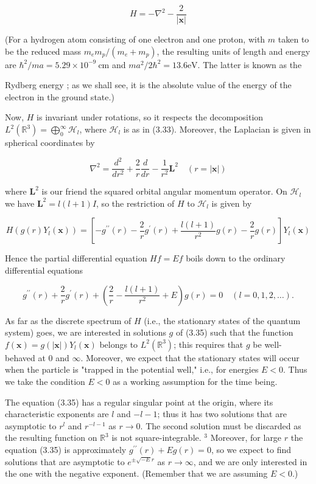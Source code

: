 \documentclass[10pt, letterpaper]{article}
\begin{document}
$$
H=-\nabla^{2}-\frac{2}{|\mathbf{x}|}
$$

(For a hydrogen atom consisting of one electron and one proton, with $m$ taken to be the reduced mass $m_{e} m_{p} /\left(m_{e}+m_{p}\right)$, the resulting units of length and energy are $\hbar^{2} / m a=5.29 \times 10^{-9} \mathrm{~cm}$ and $m a^{2} / 2 \hbar^{2}=13.6 \mathrm{eV}$. The latter is known as the

Rydberg energy ; as we shall see, it is the absolute value of the energy of the electron in the ground state.)

Now, $H$ is invariant under rotations, so it respects the decomposition $L^{2}\left(\mathbb{R}^{3}\right)= \bigoplus_{0}^{\infty} \mathcal{H}_{l}$, where $\mathcal{H}_{l}$ is as in (3.33). Moreover, the Laplacian is given in spherical coordinates by

$$
\nabla^{2}=\frac{d^{2}}{d r^{2}}+\frac{2}{r} \frac{d}{d r}-\frac{1}{r^{2}} \mathbf{L}^{2} \quad(r=|\mathbf{x}|)
$$

where $\mathbf{L}^{2}$ is our friend the squared orbital angular momentum operator. On $\mathscr{H}_{l}$ we have $\mathbf{L}^{2}=l(l+1) I$, so the restriction of $H$ to $\mathcal{H}_{l}$ is given by

$$
H\left(g(r) Y_{l}(\mathbf{x})\right)=\left[-g^{\prime \prime}(r)-\frac{2}{r} g^{\prime}(r)+\frac{l(l+1)}{r^{2}} g(r)-\frac{2}{r} g(r)\right] Y_{l}(\mathbf{x})
$$

Hence the partial differential equation $H f=E f$ boils down to the ordinary differential equations

$$
g^{\prime \prime}(r)+\frac{2}{r} g^{\prime}(r)+\left(\frac{2}{r}-\frac{l(l+1)}{r^{2}}+E\right) g(r)=0 \quad(l=0,1,2, \ldots) .
$$

As far as the discrete spectrum of $H$ (i.e., the stationary states of the quantum system) goes, we are interested in solutions $g$ of (3.35) such that the function $f(\mathbf{x})=g(|\mathbf{x}|) Y_{l}(\mathbf{x})$ belongs to $L^{2}\left(\mathbb{R}^{3}\right)$; this requires that $g$ be well-behaved at 0 and $\infty$. Moreover, we expect that the stationary states will occur when the particle is "trapped in the potential well," i.e., for energies $E<0$. Thus we take the condition $E<0$ as a working assumption for the time being.

The equation (3.35) has a regular singular point at the origin, where its characteristic exponents are $l$ and $-l-1$; thus it has two solutions that are asymptotic to $r^{l}$ and $r^{-l-1}$ as $r \rightarrow 0$. The second solution must be discarded as the resulting function on $\mathbb{R}^{3}$ is not square-integrable. ${ }^{3}$ Moreover, for large $r$ the equation (3.35) is approximately $g^{\prime \prime}(r)+E g(r)=0$, so we expect to find solutions that are asymptotic to $e^{ \pm \sqrt{-E} r}$ as $r \rightarrow \infty$, and we are only interested in the one with the negative exponent. (Remember that we are assuming $E<0$.)
\end{document}
